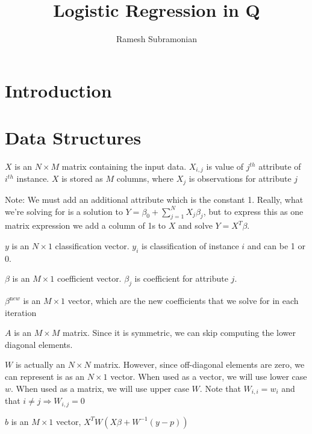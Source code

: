 \documentclass[12pt,timesnewroman,letterpaper]{article}
\begin{document}
\title{Logistic Regression in Q}
\author{ Ramesh Subramonian }
\maketitle
\thispagestyle{fancy}
\cfoot{}
\rfoot{{\small \thepage}}

\section{Introduction}

\TBC

\section{Data Structures}

\bi
\item \(X\) is an \(N \times M\) matrix containing the input data.
  \(X_{i, j}\) is value of \(j^{th}\) attribute of \(i^{th}\)
  instance. \(X\) is stored as \(M\) columns, where \(X_j\) is
  observations for attribute \(j\)

Note: We must add an additional attribute which is the constant 1. Really, what
we're solving for is a solution to $Y = \beta_0 + \sum_{j = 1}^N
X_j \beta_j$, but to express this as one matrix expression we add a column of 1s to
$X$ and solve $Y = X^T\beta$.

\item \(y\) is an \(N \times 1\) classification vector. \(y_i\) is
  classification of instance \(i\) and can be 1 or 0.
\item \(\beta\) is an \(M \times 1\) coefficient vector. \(\beta_j\)
  is coefficient for attribute \(j\). 
\item \(\beta^{\mathrm new}\) is an \(M \times 1\) vector, which are the new
  coefficients that we solve for in each iteration
\item \(A\) is an \(M \times M\) matrix. Since it is symmetric, we can skip
  computing the lower diagonal elements.
\item \(W\) is actually an \(N \times N\) matrix. However, since
  off-diagonal elements are zero, we can represent is as an \(N \times
  1\) vector.   When used as a vector, we will use lower case \(w\). When used
  as a matrix, we will use upper case \(W\). Note that \(W_{i, i} = w_i\) and
  that \( i \neq j \Rightarrow W_{i,j} = 0\)
\item \(b\) is an \(M \times 1\) vector, \(X^T W ( X \beta + W^{-1}(y - p) )\)
  \ei
\end{document}
